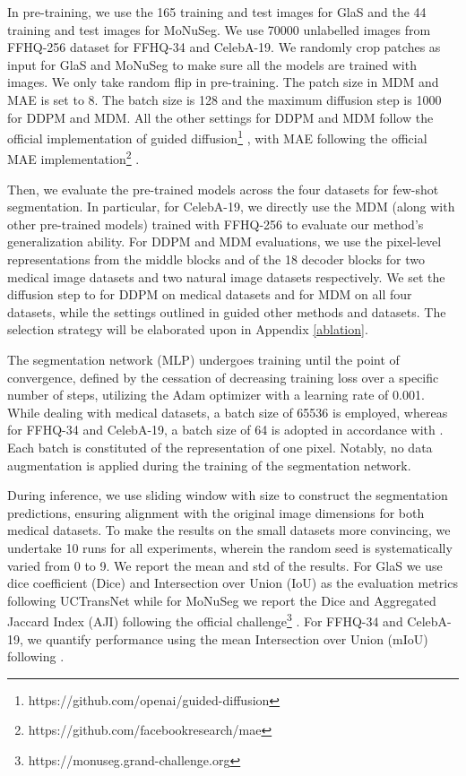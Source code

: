 \documentclass{article} \usepackage{iclr2024_conference,times}
\begin{document}
In pre-training, we use the 165 training and test images for GlaS and the 44 training and test images for MoNuSeg. We use 70000 unlabelled  images from FFHQ-256 dataset for FFHQ-34 and CelebA-19. We randomly crop  patches as input for GlaS and MoNuSeg to make sure all the models are trained with  images. We only take random flip in pre-training. The patch size in MDM and MAE is set to 8. The batch size is 128 and the maximum diffusion step  is 1000 for DDPM and MDM. All the other settings for DDPM and MDM follow the official implementation of guided diffusion\footnote{https://github.com/openai/guided-diffusion} \citep{DBLP:conf/nips/DhariwalN21}, with MAE following the official MAE implementation\footnote{https://github.com/facebookresearch/mae} \citep{DBLP:conf/cvpr/HeCXLDG22}. 

Then, we evaluate the pre-trained models across the four datasets for few-shot segmentation. In particular, for CelebA-19, we directly use the MDM (along with other pre-trained models) trained with FFHQ-256 to evaluate our method’s generalization ability.
For DDPM and MDM evaluations, we use the pixel-level representations from the middle blocks  and  of the 18 decoder blocks for two medical image datasets and two natural image datasets respectively. We set the diffusion step to  for DDPM on medical datasets and  for MDM on all four datasets, while the settings outlined in \citet{DBLP:conf/iclr/BaranchukVRKB22} guided other methods and datasets. The selection strategy will be elaborated upon in Appendix \ref{ablation}. 

The segmentation network (MLP) undergoes training until the point of convergence, defined by the cessation of decreasing training loss over a specific number of steps, utilizing the Adam optimizer with a learning rate of 0.001. While dealing with medical datasets, a batch size of 65536 is employed,  whereas for FFHQ-34 and CelebA-19, a batch size of 64 is adopted in accordance with \citet{DBLP:conf/iclr/BaranchukVRKB22}. Each batch is constituted of the representation of one pixel. Notably, no data augmentation is applied during the training of the segmentation network. 

During inference, we use sliding window with size  to construct the segmentation predictions, ensuring alignment with the original image dimensions for both medical datasets. To make the results on the small datasets more convincing, we undertake 10 runs for all experiments, wherein the random seed is systematically varied from 0 to 9. We report the mean and std of the results. For GlaS we use dice coefficient (Dice) and Intersection over Union (IoU) as the evaluation metrics following UCTransNet \citep{DBLP:conf/aaai/Wang0WZ22} while for MoNuSeg we report the Dice and Aggregated Jaccard Index (AJI) following the official challenge\footnote{https://monuseg.grand-challenge.org} \citep{DBLP:journals/tmi/KumarVSBVS17,DBLP:journals/tmi/KumarVAZOTCHLHW20}. For FFHQ-34 and CelebA-19, we quantify performance using the mean Intersection over Union (mIoU) following \citet{DBLP:conf/iclr/BaranchukVRKB22}.
\end{document}

